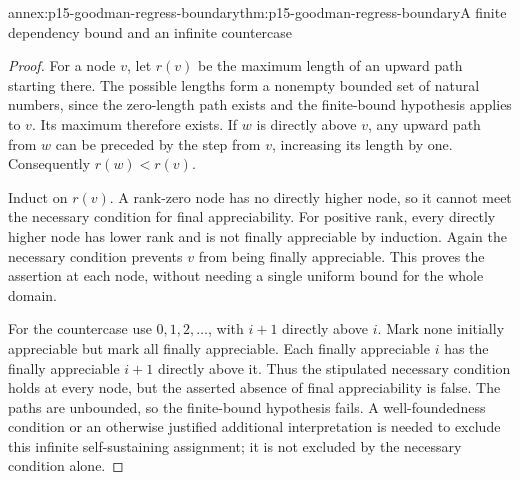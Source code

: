 \begin{annexitem}{annex:p15-goodman-regress-boundary}{thm:p15-goodman-regress-boundary}{A finite dependency bound and an infinite countercase}
\begin{proof}
For a node $v$, let $r(v)$ be the maximum length of an upward path
starting there. The possible lengths form a nonempty bounded set of
natural numbers, since the zero-length path exists and the finite-bound
hypothesis applies to $v$. Its maximum therefore exists. If $w$ is
directly above $v$, any upward path from $w$ can be preceded by the
step from $v$, increasing its length by one. Consequently $r(w)<r(v)$.

Induct on $r(v)$. A rank-zero node has no directly higher node, so it
cannot meet the necessary condition for final appreciability. For
positive rank, every directly higher node has lower rank and is not
finally appreciable by induction. Again the necessary condition
prevents $v$ from being finally appreciable. This proves the assertion
at each node, without needing a single uniform bound for the whole domain.

For the countercase use $0,1,2,\ldots$, with $i+1$ directly above
$i$. Mark none initially appreciable but mark all finally appreciable.
Each finally appreciable $i$ has the finally appreciable $i+1$ directly
above it. Thus the stipulated necessary condition holds at every node,
but the asserted absence of final appreciability is false. The paths
are unbounded, so the finite-bound hypothesis fails. A well-foundedness
condition or an otherwise justified additional interpretation is needed
to exclude this infinite self-sustaining assignment; it is not excluded
by the necessary condition alone.
\end{proof}
\end{annexitem}

